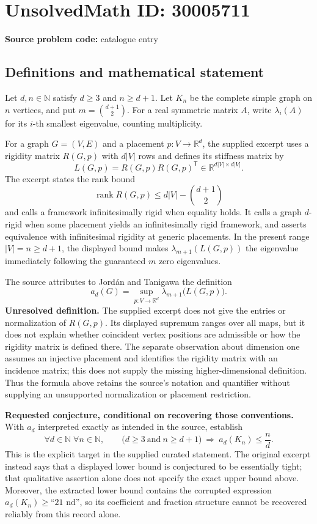 \documentclass[11pt]{article}
\newcommand{\N}{\mathbb{N}}
\newcommand{\R}{\mathbb{R}}
\begin{document}
\section*{UnsolvedMath ID: 30005711}
\textbf{Source problem code:} catalogue entry
\subsection{Definitions and mathematical statement}
Let \(d,n\in\N\) satisfy \(d\geq 3\) and \(n\geq d+1\). Let \(K_n\) be the complete simple graph on \(n\) vertices, and put \(m=\binom{d+1}{2}\). For a real symmetric matrix \(A\), write \(\lambda_i(A)\) for its \(i\)-th smallest eigenvalue, counting multiplicity.

For a graph \(G=(V,E)\) and a placement \(p:V\to\R^d\), the supplied excerpt uses a rigidity matrix \(R(G,p)\) with \(d|V|\) rows and defines its stiffness matrix by
\[
L(G,p)=R(G,p)R(G,p)^{\mathsf T}\in\R^{d|V|\times d|V|}.
\]
The excerpt states the rank bound
\[
\operatorname{rank}R(G,p)\leq d|V|-\binom{d+1}{2}
\]
and calls a framework infinitesimally rigid when equality holds. It calls a graph \(d\)-rigid when some placement yields an infinitesimally rigid framework, and asserts equivalence with infinitesimal rigidity at generic placements. In the present range \(|V|=n\geq d+1\), the displayed bound makes \(\lambda_{m+1}(L(G,p))\) the eigenvalue immediately following the guaranteed \(m\) zero eigenvalues.

The source attributes to Jord\'an and Tanigawa the definition
\[
a_d(G)=\sup_{p:V\to\R^d}\lambda_{m+1}\bigl(L(G,p)\bigr).
\]
\textbf{Unresolved definition.} The supplied excerpt does not give the entries or normalization of \(R(G,p)\). Its displayed supremum ranges over all maps, but it does not explain whether coincident vertex positions are admissible or how the rigidity matrix is defined there. The separate observation about dimension one assumes an injective placement and identifies the rigidity matrix with an incidence matrix; this does not supply the missing higher-dimensional definition. Thus the formula above retains the source's notation and quantifier without supplying an unsupported normalization or placement restriction.

\textbf{Requested conjecture, conditional on recovering those conventions.} With \(a_d\) interpreted exactly as intended in the source, establish
\[
\forall d\in\N\;\forall n\in\N,\qquad
\bigl(d\geq3\ \text{and}\ n\geq d+1\bigr)
\ \Longrightarrow\ a_d(K_n)\leq\frac nd.
\]
This is the explicit target in the supplied curated statement. The original excerpt instead says that a displayed lower bound is conjectured to be essentially tight; that qualitative assertion alone does not specify the exact upper bound above. Moreover, the extracted lower bound contains the corrupted expression \(a_d(K_n)\geq\text{``21 nd''}\), so its coefficient and fraction structure cannot be recovered reliably from this record alone.
\end{document}
